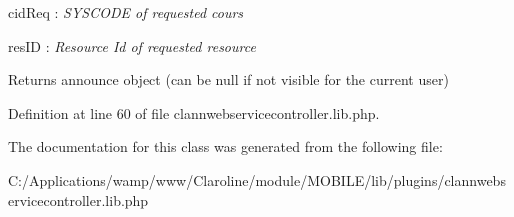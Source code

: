 \begin{DoxyPre}        cidReq : {\itshape SYSCODE of requested cours\/}\end{DoxyPre}



\begin{DoxyPre}        resID : {\itshape Resource Id of requested resource\/}\end{DoxyPre}


\begin{DoxyReturn}{Returns}
announce object (can be null if not visible for the current user) 
\end{DoxyReturn}


Definition at line 60 of file clannwebservicecontroller.lib.php.



The documentation for this class was generated from the following file:\begin{DoxyCompactItemize}
\item 
C:/Applications/wamp/www/Claroline/module/MOBILE/lib/plugins/clannwebservicecontroller.lib.php\end{DoxyCompactItemize}

